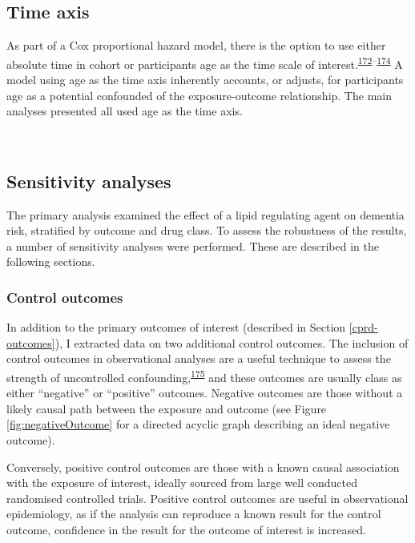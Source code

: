 \documentclass[a4paper, twoside]{templates/ociamthesis}
\begin{document}
\hypertarget{time-axis}{%
\subsection{Time axis}\label{time-axis}}

As part of a Cox proportional hazard model, there is the option to use either absolute time in cohort or participants age as the time scale of interest.\textsuperscript{\protect\hyperlink{ref-lamarca1998}{172}--\protect\hyperlink{ref-pencina2007}{174}} A model using age as the time axis inherently accounts, or adjusts, for participants age as a potential confounded of the exposure-outcome relationship. The main analyses presented all used age as the time axis.

~

\hypertarget{sensitivity-analyses-1}{%
\subsection{Sensitivity analyses}\label{sensitivity-analyses-1}}

The primary analysis examined the effect of a lipid regulating agent on dementia risk, stratified by outcome and drug class. To assess the robustness of the results, a number of sensitivity analyses were performed. These are described in the following sections.

\hypertarget{control-outcomes}{%
\subsubsection{Control outcomes}\label{control-outcomes}}

In addition to the primary outcomes of interest (described in Section \ref{cprd-outcomes}), I extracted data on two additional control outcomes. The inclusion of control outcomes in observational analyses are a useful technique to assess the strength of uncontrolled confounding,\textsuperscript{\protect\hyperlink{ref-lipsitch2010}{175}} and these outcomes are usually class as either ``negative'' or ``positive'' outcomes. Negative outcomes are those without a likely causal path between the exposure and outcome (see Figure \ref{fig:negativeOutcome} for a directed acyclic graph describing an ideal negative outcome).

Conversely, positive control outcomes are those with a known causal association with the exposure of interest, ideally sourced from large well conducted randomised controlled trials. Positive control outcomes are useful in observational epidemiology, as if the analysis can reproduce a known result for the control outcome, confidence in the result for the outcome of interest is increased.
\end{document}
